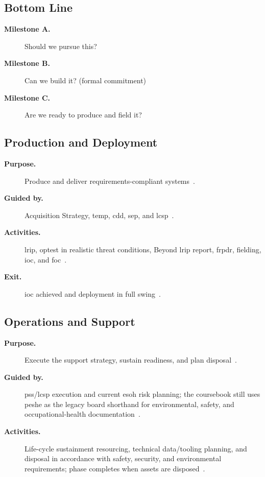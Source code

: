 \documentclass[../main.tex]{subfiles}
\begin{document}
\subsection{Bottom Line}
\begin{description}
  \item[\textbf{Milestone A.}] Should we pursue this?~\autocite{DoDI5000-85,edo-3-3-2-acq-milestones-phases-2025}
  \item[\textbf{Milestone B.}] Can we build it? (formal commitment)~\autocite{DoDI5000-85,edo-3-3-2-acq-milestones-phases-2025}
  \item[\textbf{Milestone C.}] Are we ready to produce and field it?~\autocite{DoDI5000-85,edo-3-3-2-acq-milestones-phases-2025}
\end{description}

\subsection{Production and Deployment}
\begin{description}
  \item[\textbf{Purpose.}] Produce and deliver requirements-compliant systems~\autocite{DoDI5000-85,edo-3-3-2-acq-milestones-phases-2025}.
  \item[\textbf{Guided by.}] Acquisition Strategy, \ac{temp}, \ac{cdd}, \ac{sep}, and \ac{lcsp}~\autocite{DoDI5000-85,DoDI5000-89,DoDI5000-91,edo-3-3-2-acq-milestones-phases-2025}.
  \item[\textbf{Activities.}] \ac{lrip}, \ac{optest} in realistic threat conditions, Beyond \ac{lrip} report, \ac{frpdr}, fielding, \ac{ioc}, and \ac{foc}~\autocite{DoDI5000-85,USC-10-4171,USC-10-4172,edo-3-3-2-acq-milestones-phases-2025}.
  \item[\textbf{Exit.}] \ac{ioc} achieved and deployment in full swing~\autocite{DoDI5000-85,edo-3-3-2-acq-milestones-phases-2025}.
\end{description}

\subsection{Operations and Support}
\begin{description}
  \item[\textbf{Purpose.}] Execute the support strategy, sustain readiness, and plan disposal~\autocite{DoDI5000-85,DoDI5000-91,edo-3-3-2-acq-milestones-phases-2025}.
  \item[\textbf{Guided by.}] \ac{pss}/\ac{lcsp} execution and current \ac{esoh} risk planning; the coursebook still uses \ac{peshe} as the legacy board shorthand for environmental, safety, and occupational-health documentation~\autocite{DoDI5000-85,DoDI5000-91,edo-3-3-2-acq-milestones-phases-2025}.
  \item[\textbf{Activities.}] Life-cycle sustainment resourcing, technical data/tooling planning, and disposal in accordance with safety, security, and environmental requirements; phase completes when assets are disposed~\autocite{DoDI5000-85,DoDI5000-91,edo-3-3-2-acq-milestones-phases-2025}.
\end{description}
\end{document}
